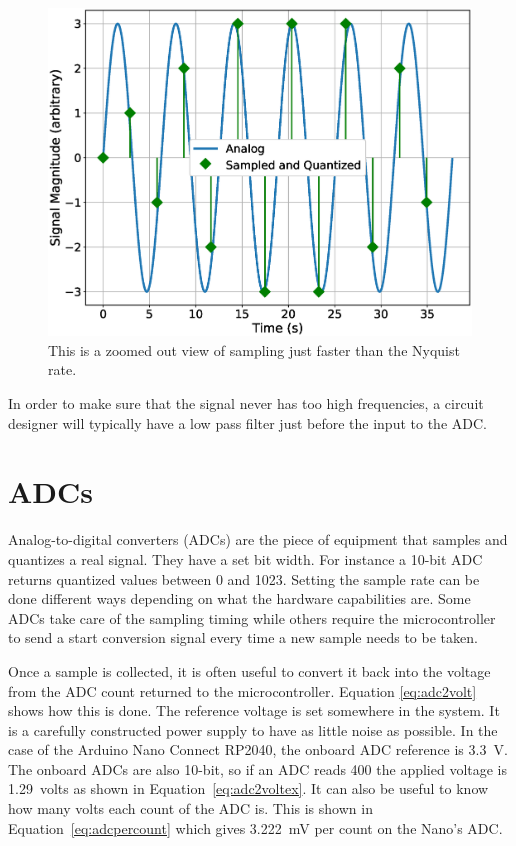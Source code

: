 \begin{figure}[!htb]
	\centering
	\includegraphics[scale=0.5]{dataCollection/nyquist4.eps}
	\caption{This is a zoomed out view of sampling just faster than the Nyquist rate.}
	\label{fig:nyquist4}
\end{figure}

In order to make sure that the signal never has too high frequencies, a circuit designer
will typically have a low pass filter just before the input to the ADC.

\section{ADCs}
Analog-to-digital converters (ADCs) are the piece of equipment that samples and quantizes a real signal.
They have a set bit width. For instance a 10-bit ADC returns quantized values between 0 and 1023. Setting
the sample rate can be done different ways depending on what the hardware capabilities are. Some ADCs 
take care of the sampling timing while others require the microcontroller to send a start conversion 
signal every time a new sample needs to be taken.

Once a sample is collected, it is often useful to convert it back into the voltage from the ADC count 
returned to the microcontroller. Equation \ref{eq:adc2volt} shows how this is done. The reference 
voltage is set somewhere in the system. It is a carefully constructed power supply to have as little
noise as possible. In the case of the Arduino Nano Connect RP2040, the onboard ADC reference is 3.3~V.
The onboard ADCs are also 10-bit, so if an ADC reads 400 the applied voltage is 1.29~volts as shown in 
Equation~\ref{eq:adc2voltex}. It can also be useful to know how many volts each count of the ADC is. 
This is shown in Equation~\ref{eq:adcpercount} which gives 3.222~mV per count on the Nano's ADC.

